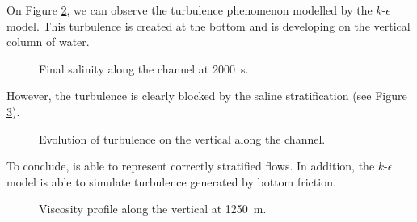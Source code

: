 \bigskip
On Figure \ref{t3d:stratification:fig:evolTurb}, we can observe 
the turbulence phenomenon modelled by the $k$-$\epsilon$ model.
This turbulence is created at the bottom and is developing on the
vertical column of water.
\begin{figure}[!htbp]
 \centering
 \caption{Final salinity along the channel at 2000~s.}
 \label{t3d:stratification:fig:sal2000}
\end{figure}

However, the turbulence is clearly blocked by the saline stratification 
(see Figure \ref{t3d:stratification:fig:visco}).

\begin{figure}[!htbp]
 \centering
 \caption{Evolution of turbulence on the vertical along the channel.}
 \label{t3d:stratification:fig:evolTurb}
\end{figure}

%
\bigskip
To conclude,  is able to represent correctly stratified flows.
In addition, the $k$-$\epsilon$ model is able to simulate turbulence
generated by bottom friction.
%
\begin{figure}[!htbp]
 \centering
 \caption{Viscosity profile along the vertical at 1250~m.}
 \label{t3d:stratification:fig:visco}
\end{figure}
